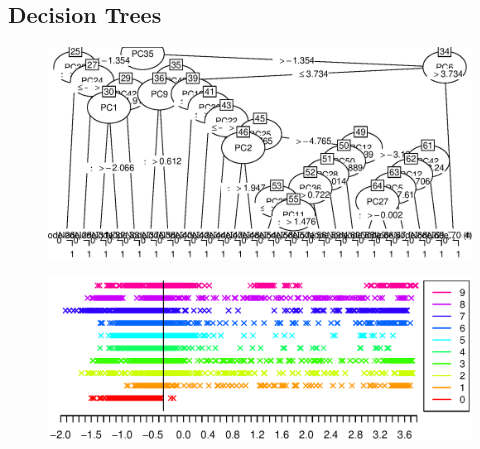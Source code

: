 \subsection{Decision Trees}

\begin{figure}
\includegraphics[width = \textwidth]{graphics/tree_section}
\end{figure}

\begin{figure}
\includegraphics[width = \textwidth]{graphics/decision_seperation}
\end{figure}


\begin{table}
\begin{tabular}{*{11}{c}}

\end{tabular}

\end{table}
